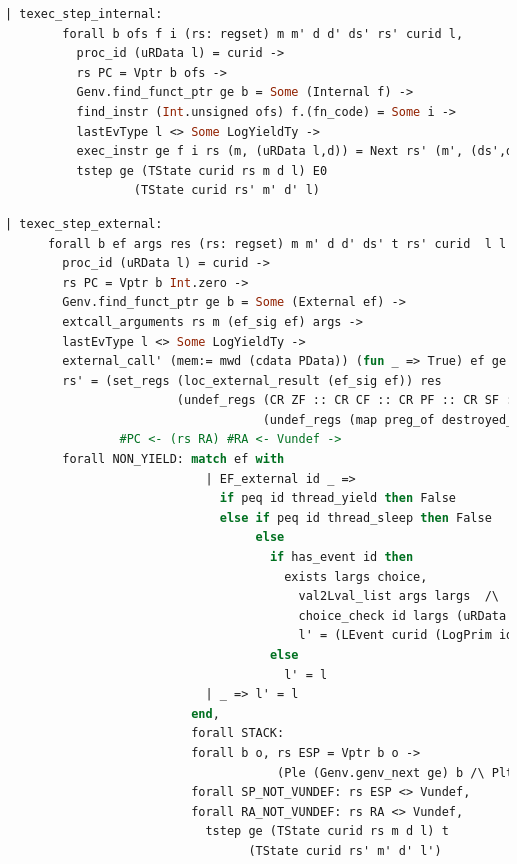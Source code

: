 \begin{lstlisting}[language=Caml]
    | texec_step_internal:
        forall b ofs f i (rs: regset) m m' d d' ds' rs' curid l,
          proc_id (uRData l) = curid ->
          rs PC = Vptr b ofs ->
          Genv.find_funct_ptr ge b = Some (Internal f) ->
          find_instr (Int.unsigned ofs) f.(fn_code) = Some i ->
          lastEvType l <> Some LogYieldTy ->
          exec_instr ge f i rs (m, (uRData l,d)) = Next rs' (m', (ds',d')) ->
          tstep ge (TState curid rs m d l) E0
                  (TState curid rs' m' d' l)
\end{lstlisting}

\begin{lstlisting}[language=Caml]
  | texec_step_external:
      forall b ef args res (rs: regset) m m' d d' ds' t rs' curid  l l',
        proc_id (uRData l) = curid ->
        rs PC = Vptr b Int.zero ->
        Genv.find_funct_ptr ge b = Some (External ef) ->
        extcall_arguments rs m (ef_sig ef) args ->
        lastEvType l <> Some LogYieldTy ->
        external_call' (mem:= mwd (cdata PData)) (fun _ => True) ef ge args (m, (uRData l, d)) t res (m', (ds',d')) ->
        rs' = (set_regs (loc_external_result (ef_sig ef)) res 
                        (undef_regs (CR ZF :: CR CF :: CR PF :: CR SF :: CR OF :: nil)
                                    (undef_regs (map preg_of destroyed_at_call) rs))) 
                #PC <- (rs RA) #RA <- Vundef ->
        forall NON_YIELD: match ef with
                            | EF_external id _ => 
                              if peq id thread_yield then False
                              else if peq id thread_sleep then False
                                   else
                                     if has_event id then
                                       exists largs choice,
                                         val2Lval_list args largs  /\
                                         choice_check id largs (uRData l) d = choice /\ 
                                         l' = (LEvent curid (LogPrim id largs choice (snap_func d)) :: l) 
                                     else
                                       l' = l
                            | _ => l' = l
                          end,
                          forall STACK:
                          forall b o, rs ESP = Vptr b o ->
                                      (Ple (Genv.genv_next ge) b /\ Plt b (Mem.nextblock m)),
                          forall SP_NOT_VUNDEF: rs ESP <> Vundef,
                          forall RA_NOT_VUNDEF: rs RA <> Vundef,
                            tstep ge (TState curid rs m d l) t 
                                  (TState curid rs' m' d' l')
\end{lstlisting}

